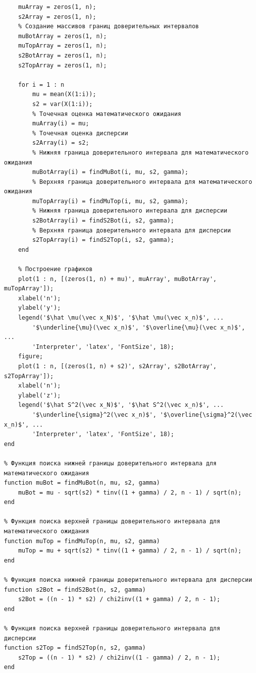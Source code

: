 \documentclass[a4paper,oneside,12pt]{extreport}
\theoremstyle{indented}
\begin{document}
\begin{lstlisting}[caption=Реализация]
    % Создание массивов точченых оценок
    muArray = zeros(1, n);
    s2Array = zeros(1, n);
    % Создание массивов границ доверительных интервалов
    muBotArray = zeros(1, n);
    muTopArray = zeros(1, n);
    s2BotArray = zeros(1, n);
    s2TopArray = zeros(1, n);
    
    for i = 1 : n
        mu = mean(X(1:i));
        s2 = var(X(1:i));
        % Точечная оценка математического ожидания
        muArray(i) = mu;
        % Точечная оценка дисперсии
        s2Array(i) = s2;
        % Нижняя граница доверительного интервала для математического ожидания
        muBotArray(i) = findMuBot(i, mu, s2, gamma);
        % Верхняя граница доверительного интервала для математического ожидания
        muTopArray(i) = findMuTop(i, mu, s2, gamma);
        % Нижняя граница доверительного интервала для дисперсии
        s2BotArray(i) = findS2Bot(i, s2, gamma);
        % Верхняя граница доверительного интервала для дисперсии
        s2TopArray(i) = findS2Top(i, s2, gamma);
    end
    
    % Построение графиков
    plot(1 : n, [(zeros(1, n) + mu)', muArray', muBotArray', muTopArray']);
    xlabel('n');
    ylabel('y');
    legend('$\hat \mu(\vec x_N)$', '$\hat \mu(\vec x_n)$', ...
        '$\underline{\mu}(\vec x_n)$', '$\overline{\mu}(\vec x_n)$', ...
        'Interpreter', 'latex', 'FontSize', 18);
    figure;
    plot(1 : n, [(zeros(1, n) + s2)', s2Array', s2BotArray', s2TopArray']);
    xlabel('n');
    ylabel('z');
    legend('$\hat S^2(\vec x_N)$', '$\hat S^2(\vec x_n)$', ...
        '$\underline{\sigma}^2(\vec x_n)$', '$\overline{\sigma}^2(\vec x_n)$', ...
        'Interpreter', 'latex', 'FontSize', 18);
end

% Функция поиска нижней границы доверительного интервала для математического ожидания
function muBot = findMuBot(n, mu, s2, gamma)
    muBot = mu - sqrt(s2) * tinv((1 + gamma) / 2, n - 1) / sqrt(n);
end

% Функция поиска верхней границы доверительного интервала для математического ожидания
function muTop = findMuTop(n, mu, s2, gamma)
    muTop = mu + sqrt(s2) * tinv((1 + gamma) / 2, n - 1) / sqrt(n);
end

% Функция поиска нижней границы доверительного интервала для дисперсии
function s2Bot = findS2Bot(n, s2, gamma)
    s2Bot = ((n - 1) * s2) / chi2inv((1 + gamma) / 2, n - 1);
end

% Функция поиска верхней границы доверительного интервала для дисперсии
function s2Top = findS2Top(n, s2, gamma)
    s2Top = ((n - 1) * s2) / chi2inv((1 - gamma) / 2, n - 1);
end

\end{lstlisting}
\end{document}
